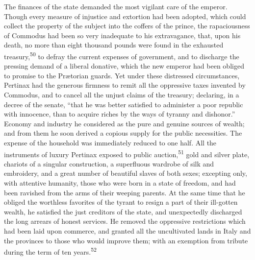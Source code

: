 The finances of the state demanded the most vigilant care of the
emperor. Though every measure of injustice and extortion had been
adopted, which could collect the property of the subject into the
coffers of the prince, the rapaciousness of Commodus had been so
very inadequate to his extravagance, that, upon his death, no
more than eight thousand pounds were found in the exhausted
treasury,\textsuperscript{50} to defray the current expenses of government, and to
discharge the pressing demand of a liberal donative, which the
new emperor had been obliged to promise to the Prætorian guards.
Yet under these distressed circumstances, Pertinax had the
generous firmness to remit all the oppressive taxes invented by
Commodus, and to cancel all the unjust claims of the treasury;
declaring, in a decree of the senate, “that he was better
satisfied to administer a poor republic with innocence, than to
acquire riches by the ways of tyranny and dishonor.” Economy and
industry he considered as the pure and genuine sources of wealth;
and from them he soon derived a copious supply for the public
necessities. The expense of the household was immediately reduced
to one half. All the instruments of luxury Pertinax exposed to
public auction,\textsuperscript{51} gold and silver plate, chariots of a singular
construction, a superfluous wardrobe of silk and embroidery, and
a great number of beautiful slaves of both sexes; excepting only,
with attentive humanity, those who were born in a state of
freedom, and had been ravished from the arms of their weeping
parents. At the same time that he obliged the worthless favorites
of the tyrant to resign a part of their ill-gotten wealth, he
satisfied the just creditors of the state, and unexpectedly
discharged the long arrears of honest services. He removed the
oppressive restrictions which had been laid upon commerce, and
granted all the uncultivated lands in Italy and the provinces to
those who would improve them; with an exemption from tribute
during the term of ten years.\textsuperscript{52}



